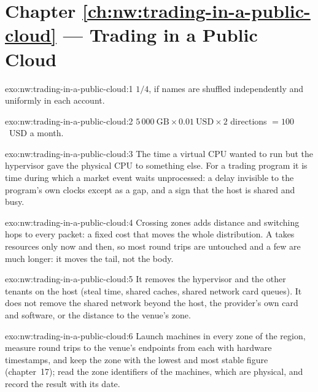 \section*{Chapter \ref{ch:nw:trading-in-a-public-cloud} --- Trading in a Public Cloud}

\begin{solution}{exo:nw:trading-in-a-public-cloud:1}
$1/4$, if names are shuffled independently and uniformly in each account.
\end{solution}

\begin{solution}{exo:nw:trading-in-a-public-cloud:2}
$5\,000~\mathrm{GB} \times 0.01~\mathrm{USD} \times 2$ directions $= 100$~USD a month.
\end{solution}

\begin{solution}{exo:nw:trading-in-a-public-cloud:3}
The time a virtual CPU wanted to run but the hypervisor gave the physical CPU to something else. For a trading program it is time during which a
market event waits unprocessed: a delay invisible to the program's own clocks except as a gap, and a sign that the host is shared and busy.
\end{solution}

\begin{solution}{exo:nw:trading-in-a-public-cloud:4}
Crossing zones adds distance and switching hops to every packet: a fixed cost that moves the whole distribution. A  takes resources only
now and then, so most round trips are untouched and a few are much longer: it moves the tail, not the body.
\end{solution}

\begin{solution}{exo:nw:trading-in-a-public-cloud:5}
It removes the hypervisor and the other tenants on the host (steal time, shared caches, shared network card queues). It does not remove the shared
network beyond the host, the provider's own card and software, or the distance to the venue's zone.
\end{solution}

\begin{solution}{exo:nw:trading-in-a-public-cloud:6}
Launch machines in every zone of the region, measure round trips to the venue's endpoints from each with hardware timestamps, and keep the zone with the
lowest and most stable figure (chapter~17); read the zone identifiers of the machines, which are physical, and record the result with its date.
\end{solution}

